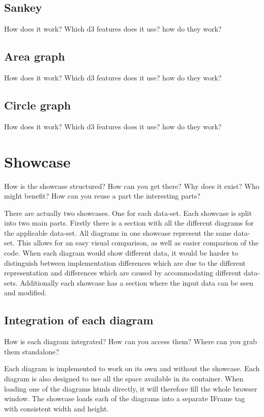 \subsection{Sankey}
How does it work? Which d3 features does it use? how do they work?

\subsection{Area graph}
How does it work? Which d3 features does it use? how do they work?

\subsection{Circle graph}
How does it work? Which d3 features does it use? how do they work?


\section{Showcase}
How is the showcase structured? How can you get there? Why does it exist? Who might benefit? How can you reuse a part the interesting parts?

There are actually two showcases. One for each data-set. Each showcase is split into two main parts. Firstly there is a section with all the different diagrams for the applicable data-set. All diagrams in one showcase represent the same data-set. This allows for an easy visual comparison, as well as easier comparison of the code. When each diagram would show different data, it would be harder to distinguish between implementation differences which are due to the different representation and differences which are caused by accommodating different data-sets. Additionally each showcase has a section where the input data can be seen and modified.

\subsection{Integration of each diagram}
How is each diagram integrated? How can you access them? Where can you grab them standalone?

Each diagram is implemented to work on its own and without the showcase. Each diagram is also designed to use all the space available in its container. When loading one of the diagrams htmls directly, it will therefore fill the whole browser window. The showcase loads each of the diagrams into a separate IFrame tag with consistent width and height.

